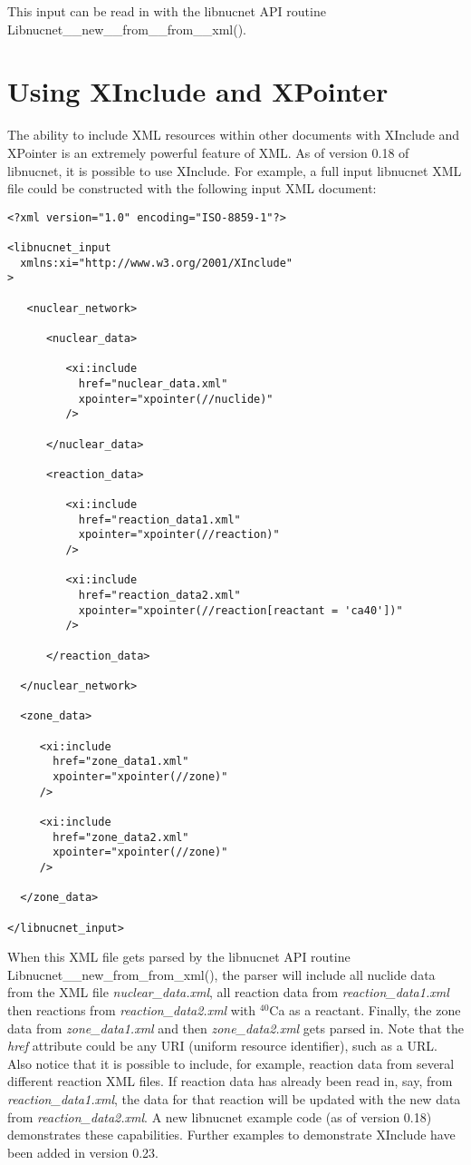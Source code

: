 \documentclass{article}    %
\begin{document}
This input can be read in with the libnucnet API routine
Libnucnet\_\_new\_\_from\_\_from\_\_xml().

\section{Using XInclude and XPointer}

The ability to include XML resources within other documents with
XInclude and XPointer is an extremely powerful feature of XML.
As of version 0.18 of libnucnet, it is possible to use XInclude.
For example, a full input libnucnet XML file could be constructed with
the following input XML document:

\begin{verbatim}
<?xml version="1.0" encoding="ISO-8859-1"?>

<libnucnet_input
  xmlns:xi="http://www.w3.org/2001/XInclude"
>

   <nuclear_network>

      <nuclear_data>

         <xi:include
           href="nuclear_data.xml"
           xpointer="xpointer(//nuclide)"
         />

      </nuclear_data>

      <reaction_data>

         <xi:include
           href="reaction_data1.xml"
           xpointer="xpointer(//reaction)"
         />

         <xi:include
           href="reaction_data2.xml"
           xpointer="xpointer(//reaction[reactant = 'ca40'])"
         />

      </reaction_data>

  </nuclear_network>

  <zone_data>

     <xi:include
       href="zone_data1.xml"
       xpointer="xpointer(//zone)"
     />

     <xi:include
       href="zone_data2.xml"
       xpointer="xpointer(//zone)"
     />

  </zone_data>

</libnucnet_input>

\end{verbatim}

When this XML file gets parsed by the libnucnet API routine
Libnucnet\_\_new\_from\_from\_xml(), the parser will include
all nuclide data from the XML file {\em nuclear\_data.xml}, all reaction
data from {\em reaction\_data1.xml} then reactions from
{\em reaction\_data2.xml} with $^{40}$Ca as a reactant.  Finally,
the zone data from {\em zone\_data1.xml} and then 
{\em zone\_data2.xml} gets parsed in.
Note that the {\em href} attribute could be any URI (uniform resource
identifier), such as a URL.  Also notice that it is possible to include,
for example, reaction data from several different reaction XML files.
If reaction data has already been read in, say, from {\em reaction\_data1.xml},
the data for that reaction will be updated with the new data from 
{\em reaction\_data2.xml}.  A new libnucnet example code (as of
version 0.18) demonstrates these capabilities.  Further examples to
demonstrate XInclude have been added in version 0.23.
\end{document}
